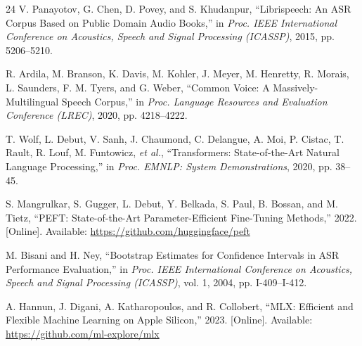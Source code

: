 \documentclass[conference]{IEEEtran}
\begin{document}
\begin{thebibliography}{24}
V. Panayotov, G. Chen, D. Povey, and S. Khudanpur, ``Librispeech: An
ASR Corpus Based on Public Domain Audio Books,'' in \emph{Proc. IEEE
International Conference on Acoustics, Speech and Signal Processing
(ICASSP)}, 2015, pp. 5206--5210.

R. Ardila, M. Branson, K. Davis, M. Kohler, J. Meyer, M. Henretty,
R. Morais, L. Saunders, F. M. Tyers, and G. Weber, ``Common Voice: A
Massively-Multilingual Speech Corpus,'' in \emph{Proc. Language
Resources and Evaluation Conference (LREC)}, 2020, pp. 4218--4222.

T. Wolf, L. Debut, V. Sanh, J. Chaumond, C. Delangue, A. Moi,
P. Cistac, T. Rault, R. Louf, M. Funtowicz, \emph{et al.},
``Transformers: State-of-the-Art Natural Language Processing,'' in
\emph{Proc. EMNLP: System Demonstrations}, 2020, pp. 38--45.

S. Mangrulkar, S. Gugger, L. Debut, Y. Belkada, S. Paul, B. Bossan, and
M. Tietz, ``PEFT: State-of-the-Art Parameter-Efficient Fine-Tuning
Methods,'' 2022. [Online]. Available: \url{https://github.com/huggingface/peft}

M. Bisani and H. Ney, ``Bootstrap Estimates for Confidence Intervals in
ASR Performance Evaluation,'' in \emph{Proc. IEEE International
Conference on Acoustics, Speech and Signal Processing (ICASSP)}, vol. 1,
2004, pp. I-409--I-412.

A. Hannun, J. Digani, A. Katharopoulos, and R. Collobert, ``MLX:
Efficient and Flexible Machine Learning on Apple Silicon,'' 2023.
[Online]. Available: \url{https://github.com/ml-explore/mlx}

\end{thebibliography}
\end{document}
